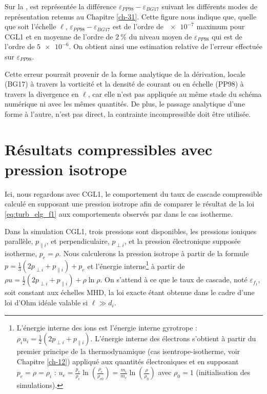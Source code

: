  Sur la  , est représentée la différence $\varepsilon_{PP98}-\varepsilon_{BG17}$ suivant les différents modes de représentation retenus au Chapitre \ref{ch-31}. Cette figure nous indique que, quelle que soit l'échelle $\boldsymbol{\ell}$, $\varepsilon_{PP98}-\varepsilon_{BG17}$ est de l'ordre de $\num{e-7}$ maximum pour CGL1 et en moyenne de l'ordre de $\SI{2}{\%}$ du niveau moyen de $\varepsilon_{PP98}$ qui est de l'ordre de $\num{5e-6}$. On obtient ainsi une estimation relative de l'erreur effectuée sur $\varepsilon_{PP98}$. 
 
 Cette erreur pourrait provenir de la forme analytique de la dérivation, locale (BG17) à travers la vorticité  et la densité de courant ou en échelle (PP98) à travers la divergence en $\ell$, car elle n'est pas appliquée au même stade du schéma numérique ni avec les mêmes quantités. De plus, le passage analytique d'une forme à l'autre, n'est pas direct, la contrainte incompressible doit être utilisée. 
 
 \section{Résultats compressibles avec pression isotrope }
 \label{an:compa_predict}

 Ici, nous regardons avec CGL1, le comportement du taux de cascade compressible calculé en supposant une pression isotrope afin de comparer le résultat de la loi \eqref{eq:turb_elg_f1} aux comportements observés par  dans le cas isotherme. 
 
 Dans la simulation CGL1, trois pressions sont disponibles, les pressions ioniques parallèle, $p_{\parallel i}$, et perpendiculaire, $p_{\perp i}$, et la pression électronique supposée isotherme, $p_{e} = \rho$. Nous calculerons la pression isotrope à partir de la formule $p = \frac{1}{3}\left(2p_{\perp i} + p_{\parallel i}\right) + p_{e}$ et l'énergie interne\footnote{ 
 L'énergie interne des ions est l'énergie interne gyrotrope : $\rho_i u_i = \frac{1}{2}\left(2p_{\perp i} + p_{\parallel i}\right)$. L'énergie interne des électrons s'obtient à partir du premier principe de la thermodynamique (cas isentrope-isotherme, voir Chapitre \ref{ch-12}) appliqué aux quantités électroniques et en supposant $p_e = \rho = \rho_i$ : $ u_e  = \frac{p_e}{\rho_e} \ln \left( \frac{\rho_e}{\rho_{e0}}\right) =   \frac{m_i}{m_e} \ln \left( \frac{\rho}{\rho_{0}}\right) $ avec $\rho_0 = 1$ (initialisation des simulations).} à partir de $\rho u = \frac{1}{2}\left(2p_{\perp i} + p_{\parallel i}\right) + \rho \ln \rho$.
 On s'attend à ce que le taux de cascade, noté $\varepsilon_{f_1}$, soit constant aux échelles MHD, la loi exacte étant obtenue dans le cadre d'une loi d'Ohm idéale valable si $\ell \gg d_i$. 

